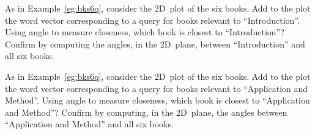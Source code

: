 \begin{exercise} \label{ex:} 
As in Example~\ref{eg:bks6q}, consider the 2D~plot of the six books. Add to the plot the word vector corresponding to a query for books relevant to ``Introduction''.
Using angle to measure closeness, which book is closest to ``Introduction''?  
Confirm by computing the angles, in the 2D~plane, between ``Introduction'' and all six books.
\end{exercise}



\begin{exercise} \label{ex:} 
As in Example~\ref{eg:bks6q}, consider the 2D~plot of the six books. Add to the plot the word vector corresponding to a query for books relevant to ``Application and Method''.
Using angle to measure closeness, which book is closest to ``Application and Method''?  
Confirm by computing, in the 2D~plane, the angles between ``Application and Method'' and all six books.
\end{exercise}




